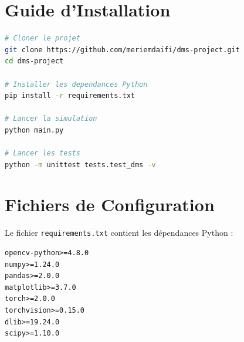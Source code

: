 \documentclass[12pt,a4paper]{report}
\begin{document}
\section{Guide d'Installation}

\begin{lstlisting}[language=bash, caption={Installation des dépendances.}]
# Cloner le projet
git clone https://github.com/meriemdaifi/dms-project.git
cd dms-project

# Installer les dependances Python
pip install -r requirements.txt

# Lancer la simulation
python main.py

# Lancer les tests
python -m unittest tests.test_dms -v
\end{lstlisting}

\section{Fichiers de Configuration}

Le fichier \texttt{requirements.txt} contient les dépendances Python :
\begin{lstlisting}[language={}, caption={Fichier requirements.txt.}]
opencv-python>=4.8.0
numpy>=1.24.0
pandas>=2.0.0
matplotlib>=3.7.0
torch>=2.0.0
torchvision>=0.15.0
dlib>=19.24.0
scipy>=1.10.0
\end{lstlisting}
\end{document}
